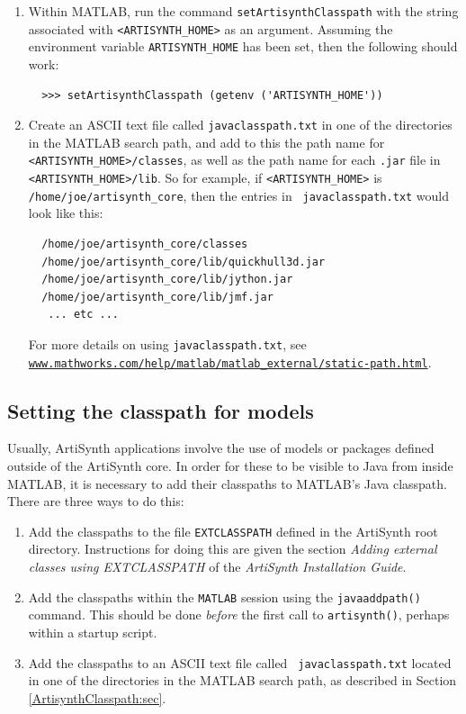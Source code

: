 \documentclass{article}
\begin{document}
\begin{enumerate}

\item Within MATLAB, run the command {\tt setArtisynthClasspath} with
the string associated with {\tt <ARTISYNTH\_HOME>} as an argument.
Assuming the environment variable {\tt ARTISYNTH\_HOME} has been
set, then the following should work:
%
\begin{verbatim}
  >>> setArtisynthClasspath (getenv ('ARTISYNTH_HOME'))
\end{verbatim}
%

\item Create an ASCII text file called {\tt javaclasspath.txt} in one
of the directories in the MATLAB search path, and add to
this the path name for {\tt <ARTISYNTH\_HOME>/classes}, as well as the
path name for each {\tt .jar} file in {\tt <ARTISYNTH\_HOME>/lib}.  So
for example, if {\tt <ARTISYNTH\_HOME>} is {\tt
/home/joe/artisynth\_core}, then the entries in {\tt
javaclasspath.txt} would look like this:
%
\begin{verbatim}
  /home/joe/artisynth_core/classes
  /home/joe/artisynth_core/lib/quickhull3d.jar
  /home/joe/artisynth_core/lib/jython.jar
  /home/joe/artisynth_core/lib/jmf.jar
   ... etc ...
\end{verbatim}
%
For more details on using {\tt javaclasspath.txt}, see\\
\href{https://www.mathworks.com/help/matlab/matlab\_external/static-path.html}
{\tt www.mathworks.com/help/matlab/matlab\_external/static-path.html}.

\end{enumerate}

\subsection{Setting the classpath for models}
\label{ModelClasspath:sec}

Usually, ArtiSynth applications involve the use of models or packages
defined outside of the ArtiSynth core. In order for these to be
visible to Java from inside MATLAB, it is necessary to add their
classpaths to MATLAB's Java classpath. There are three ways to do this:

\begin{enumerate}

\item Add the classpaths to the file {\tt EXTCLASSPATH} defined in the
ArtiSynth root directory. Instructions for doing this are given the
section {\it Adding external classes using EXTCLASSPATH} of the {\it
ArtiSynth Installation Guide}.

\item Add the classpaths within the {\tt MATLAB} session using the
{\tt javaaddpath()} command. This should be done {\it before} the
first call to {\tt artisynth()}, perhaps within a startup script.

\item Add the classpaths to an ASCII text file called {\tt
javaclasspath.txt} located in one of the directories in the MATLAB
search path, as described in Section \ref{ArtisynthClasspath:sec}.

\end{enumerate}
\end{document}
